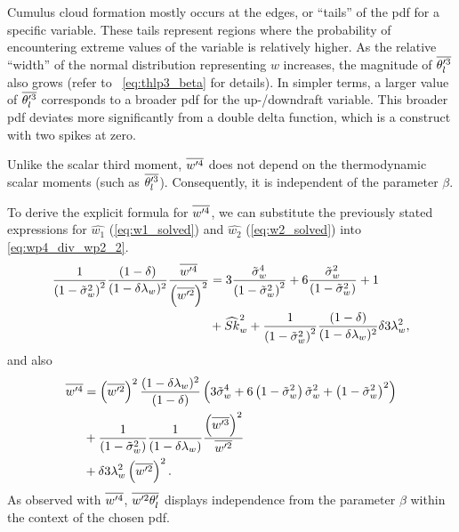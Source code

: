 Cumulus cloud formation mostly occurs at the edges,
or \enquote{tails} of the \gls{pdf} for a specific variable.
These tails represent regions where the probability of encountering extreme values of the variable is relatively higher.
As the relative \enquote{width} of the normal distribution representing $w$ increases,
the magnitude of $\overline{\theta_l'^3}$ also grows (refer to ~\eqref{eq:thlp3_beta} for details).
In simpler terms, a larger value of $\overline{\theta_l'^3}$ corresponds to a broader \gls{pdf} for the up-/downdraft variable.
This broader \gls{pdf} deviates more significantly from a double delta function,
which is a construct with two spikes at zero.

Unlike the scalar third moment,
$\overline{w'^4}$ does not depend on the thermodynamic scalar moments (such as $\overline{\theta_l'^3}$).
Consequently, it is independent of the parameter $\beta$.

To derive the explicit formula for $\overline{w'^4}$,
we can substitute the previously stated expressions for $\widehat{w_1}$ (\cref{eq:w1_solved})
and $\widehat{w_2}$ (\cref{eq:w2_solved}) into \cref{eq:wp4_div_wp2_2}.
\begin{align}
    \label{eq:wp4_div_wp2_2_solved}
    \frac{1}{\left( 1 - \tilde{\sigma}_w^2 \right)^2} \frac{(1-\delta)}{(1-\delta \lambda_w)^2} \frac{\overline{w'^4}}{\left(\overline{w'^2}\right)^2}
    &= 3 \frac{{\tilde{\sigma}_w}^4}{\left( 1 - \tilde{\sigma}_w^2 \right)^2} + 6 \frac{{\tilde{\sigma}_w}^2}{\left( 1 - \tilde{\sigma}_w^2 \right)} + 1 \nonumber\\
    &+ \widehat{Sk}_w^2 + \frac{1}{\left( 1 - \tilde{\sigma}_w^2 \right)^2} \frac{(1-\delta)}{(1-\delta \lambda_w)^2} \delta 3 \lambda_w^2,
\end{align}
and also
\begin{align}
    \label{eq:wp4}
    \overline{w'^4}
    &= \left(\overline{w'^2}\right)^2
    \frac{(1-\delta \lambda_w)^2}{(1-\delta)}
    \left(3 \tilde{\sigma}_w^4 + 6 \left( 1 - \tilde{\sigma}_w^2 \right) \tilde{\sigma}_w^2 + \left( 1 - \tilde{\sigma}_w^2 \right)^2\right) \nonumber\\
    &+ \frac{1}{\left( 1 - \tilde{\sigma}_w^2 \right)} \frac{1}{(1-\delta \lambda_w)}
    \frac{\left(\overline{w'^3}\right)^2}{\overline{w'^2}} \nonumber\\
    &+ \delta 3 \lambda_w^2 \left(\overline{w'^2}\right)^2.
\end{align}
As observed with $\overline{w'^4}$,
$\overline{w'^2 \theta_l'}$ displays independence from the parameter $\beta$
within the context of the chosen \gls{pdf}.

